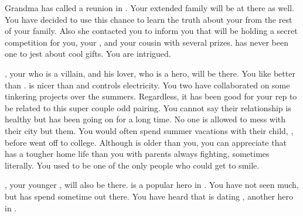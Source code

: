 \documentclass[char]{LRSguildcamp1}
\begin{document}
Grandma has called a reunion in \pCityGrandma{}. Your extended family will be at there as well. You have decided to use this chance to learn the truth about your \cAS{\parent} from the rest of your family. Also she contacted you to inform you that \cGrandma{\they} will be holding a secret competition for you, your \cTween{\sibling}, and your cousin with several prizes. \cGrandma{} has never been one to jest about cool gifts. You are intrigued.  

\cOldest{}, your \cOldest{\uncle} who is a villain, and his lover, \cOS{} who is a hero, will be there. You like \cOS{} better than \cOldest{}. \cOS{\They} is nicer than \cOldest{} and controls electricity. You two have collaborated on some tinkering projects over the summers. Regardless, it has been good for your rep to be related to this super couple odd pairing. You cannot say their relationship is healthy but has been going on for a long time. No one is allowed to mess with their city but them.  You would often spend summer vacations with their child, \cGrad{}, before \cGrad{\they} went off to college. Although \cGrad{} is older than you, you can appreciate that \cGrad{} has a tougher home life than you with parents always fighting, sometimes literally. You used to be one of the only people who could get \cGrad{} to smile.

\cYoungest{}, your younger \cYoungest{\uncle}, will also be there. \cYoungest{\They} is a popular hero in \pCityYoungest{}. You have not seen \cYoungest{\them} much, but \cTween{} has spend sometime out there. You have heard that \cYoungest{} is dating \cYS{}, another hero in \pCityYoungest{}.
\end{document}
